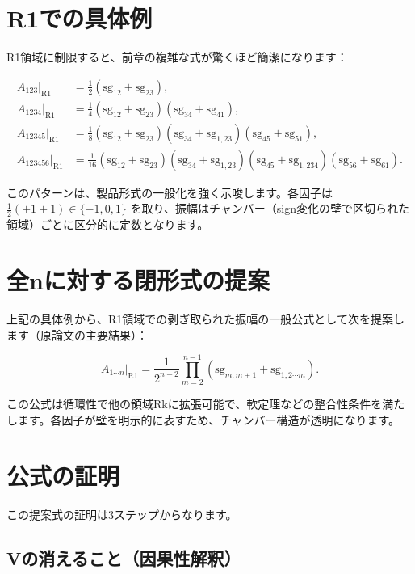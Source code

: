 \documentclass[dvipdfmx,a4paper]{jsbook}
\theoremstyle{definition}
\theoremstyle{remark}
\begin{document}
\section{R1での具体例}

R1領域に制限すると、前章の複雑な式が驚くほど簡潔になります：

\begin{align}
  A_{123}|_{\text{R1}} &= \frac{1}{2} (\mathrm{sg}_{12} + \mathrm{sg}_{23}), \\
  A_{1234}|_{\text{R1}} &= \frac{1}{4} (\mathrm{sg}_{12} + \mathrm{sg}_{23})(\mathrm{sg}_{34} + \mathrm{sg}_{41}), \\
  A_{12345}|_{\text{R1}} &= \frac{1}{8} (\mathrm{sg}_{12} + \mathrm{sg}_{23})(\mathrm{sg}_{34} + \mathrm{sg}_{1,23})(\mathrm{sg}_{45} + \mathrm{sg}_{51}), \\
  A_{123456}|_{\text{R1}} &= \frac{1}{16} (\mathrm{sg}_{12} + \mathrm{sg}_{23})(\mathrm{sg}_{34} + \mathrm{sg}_{1,23})(\mathrm{sg}_{45} + \mathrm{sg}_{1,234})(\mathrm{sg}_{56} + \mathrm{sg}_{61}).
\end{align}

このパターンは、製品形式の一般化を強く示唆します。各因子は \(\frac{1}{2}( \pm 1 \pm 1 ) \in \{-1,0,1\}\) を取り、振幅はチャンバー（sign変化の壁で区切られた領域）ごとに区分的に定数となります。

\section{全nに対する閉形式の提案}

上記の具体例から、R1領域での剥ぎ取られた振幅の一般公式として次を提案します（原論文の主要結果）：

\[
A_{1\cdots n}|_{\text{R1}} = \frac{1}{2^{n-2}} \prod_{m=2}^{n-1} \left( \mathrm{sg}_{m,m+1} + \mathrm{sg}_{1,2\cdots m} \right).
\]

この公式は循環性で他の領域Rkに拡張可能で、軟定理などの整合性条件を満たします。各因子が壁を明示的に表すため、チャンバー構造が透明になります。

\section{公式の証明}

この提案式の証明は3ステップからなります。

\subsection{Vの消えること（因果性解釈）}
\end{document}
